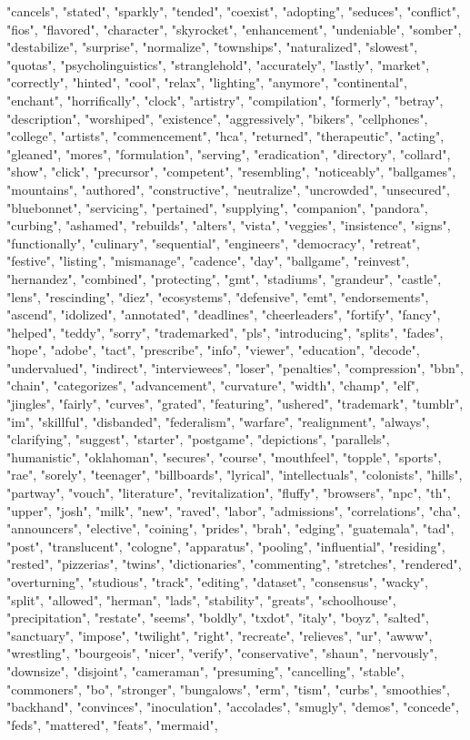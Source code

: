 "cancels", "stated", "sparkly", "tended", "coexist", "adopting", "seduces", "conflict", "fios", "flavored", "character", "skyrocket", "enhancement", "undeniable", "somber", "destabilize", "surprise", "normalize", "townships", "naturalized", "slowest", "quotas", "psycholinguistics", "stranglehold", "accurately", "lastly", "market", "correctly", "hinted", "cool", "relax", "lighting", "anymore", "continental", "enchant", "horrifically", "clock", "artistry", "compilation", "formerly", "betray", "description", "worshiped", "existence", "aggressively", "bikers", "cellphones", "college", "artists", "commencement", "hca", "returned", "therapeutic", "acting", "gleaned", "mores", "formulation", "serving", "eradication", "directory", "collard", "show", "click", "precursor", "competent", "resembling", "noticeably", "ballgames", "mountains", "authored", "constructive", "neutralize", "uncrowded", "unsecured", "bluebonnet", "servicing", "pertained", "supplying", "companion", "pandora", "curbing", "ashamed", "rebuilds", "alters", "vista", "veggies", "insistence", "signs", "functionally", "culinary", "sequential", "engineers", "democracy", "retreat", "festive", "listing", "mismanage", "cadence", "day", "ballgame", "reinvest", "hernandez", "combined", "protecting", "gmt", "stadiums", "grandeur", "castle", "lens", "rescinding", "diez", "ecosystems", "defensive", "emt", "endorsements", "ascend", "idolized", "annotated", "deadlines", "cheerleaders", "fortify", "fancy", "helped", "teddy", "sorry", "trademarked", "pls", "introducing", "splits", "fades", "hope", "adobe", "tact", "prescribe", "info", "viewer", "education", "decode", "undervalued", "indirect", "interviewees", "loser", "penalties", "compression", "bbn", "chain", "categorizes", "advancement", "curvature", "width", "champ", "elf", "jingles", "fairly", "curves", "grated", "featuring", "ushered", "trademark", "tumblr", "im", "skillful", "disbanded", "federalism", "warfare", "realignment", "always", "clarifying", "suggest", "starter", "postgame", "depictions", "parallels", "humanistic", "oklahoman", "secures", "course", "mouthfeel", "topple", "sports", "rae", "sorely", "teenager", "billboards", "lyrical", "intellectuals", "colonists", "hills", "partway", "vouch", "literature", "revitalization", "fluffy", "browsers", "npc", "th", "upper", "josh", "milk", "new", "raved", "labor", "admissions", "correlations", "cha", "announcers", "elective", "coining", "prides", "brah", "edging", "guatemala", "tad", "post", "translucent", "cologne", "apparatus", "pooling", "influential", "residing", "rested", "pizzerias", "twins", "dictionaries", "commenting", "stretches", "rendered", "overturning", "studious", "track", "editing", "dataset", "consensus", "wacky", "split", "allowed", "herman", "lads", "stability", "greats", "schoolhouse", "precipitation", "restate", "seems", "boldly", "txdot", "italy", "boyz", "salted", "sanctuary", "impose", "twilight", "right", "recreate", "relieves", "ur", "awww", "wrestling", "bourgeois", "nicer", "verify", "conservative", "shaun", "nervously", "downsize", "disjoint", "cameraman", "presuming", "cancelling", "stable", "commoners", "bo", "stronger", "bungalows", "erm", "tism", "curbs", "smoothies", "backhand", "convinces", "inoculation", "accolades", "smugly", "demos", "concede", "feds", "mattered", "feats", "mermaid", 